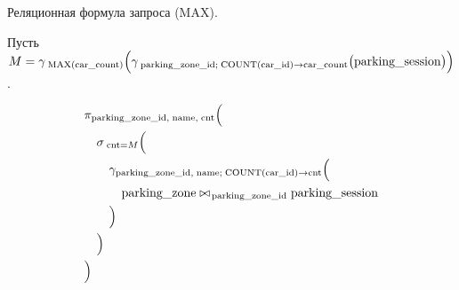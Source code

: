 \noindent Реляционная формула запроса (MAX).

\noindent Пусть $M = \gamma_{\;\text{MAX}(\text{car\_count})}\Bigl(
  \gamma_{\;\text{parking\_zone\_id};\;\text{COUNT}(\text{car\_id}) \to \text{car\_count}}\bigl(\text{parking\_session}\bigr)
\Bigr)$.

\[
\begin{aligned}
&\pi_{
  \text{parking\_zone\_id},\;\text{name},\;\text{cnt}
}\Bigl( \\
&\quad\sigma_{\;\text{cnt} = M}\Bigl( \\
&\qquad\gamma_{
  \text{parking\_zone\_id},\;\text{name};\;
  \text{COUNT}(\text{car\_id}) \to \text{cnt}
}\Bigl( \\
&\quad\qquad\text{parking\_zone}
  \bowtie_{\,\text{parking\_zone\_id}}
  \text{parking\_session} \\
&\qquad\Bigr) \\
&\quad\Bigr) \\
&\Bigr)
\end{aligned}
\]


